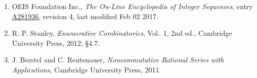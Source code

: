 \documentclass[11pt]{article}
\theoremstyle{definition}
\begin{document}
\begin{enumerate}

\item OEIS Foundation Inc., \emph{The On-Line Encyclopedia of Integer Sequences}, entry \href{https://oeis.org/A281936}{A281936}, revision 4, last modified Feb 02 2017.

\item R. P. Stanley, \emph{Enumerative Combinatorics}, Vol.~1, 2nd ed., Cambridge University Press, 2012; \S4.7.

\item J. Berstel and C. Reutenauer, \emph{Noncommutative Rational Series with Applications}, Cambridge University Press, 2011.

\end{enumerate}
\end{document}
